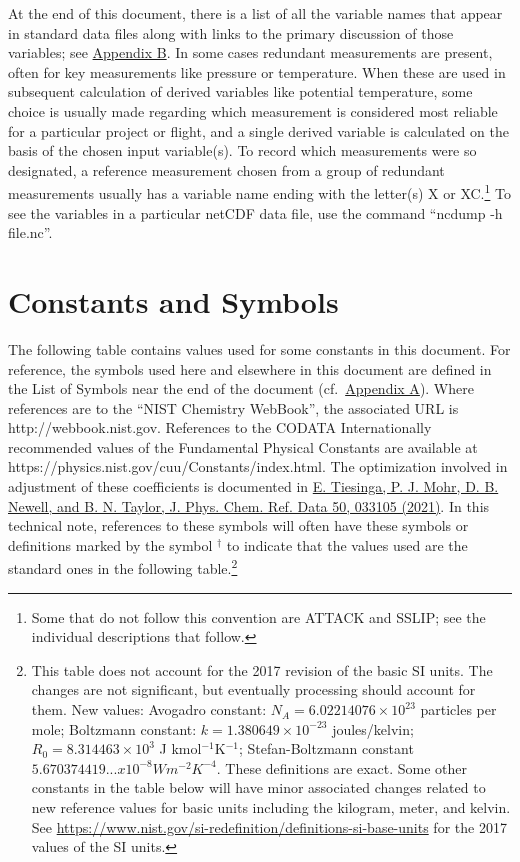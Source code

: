 \documentclass[
]{book}
\begin{document}
At the end of this document, there is a list of all the variable names that appear in standard data files along with links to the primary discussion of those variables; see \href{./appendix-b-variable-names.html\#variable-names}{Appendix B}. In some cases redundant measurements are present, often for key measurements like pressure or temperature. When these are used in subsequent calculation of derived variables like potential temperature, some choice is usually made regarding which measurement is considered most reliable for a particular project or flight, and a single derived variable is calculated on the basis of the chosen input variable(s). To record which measurements were so designated, a reference measurement chosen from a group of redundant measurements usually has a variable name ending with the letter(s) X or XC.\footnote{Some that do not follow this convention are ATTACK and SSLIP; see the individual descriptions that follow.}
To see the variables in a particular netCDF data file, use the command ``ncdump -h file.nc''.

\hypertarget{constants-and-symbols}{%
\section{Constants and Symbols}\label{constants-and-symbols}}

The following table contains values used for some constants in this document. For reference, the symbols used here and elsewhere in this document are defined in the List of Symbols near the end of the document (cf.~\href{./appendix-a-list-of-symbols.html\#list-of-symbols}{Appendix A}). Where references are to the ``NIST Chemistry WebBook'', the associated URL is http://webbook.nist.gov. References to the CODATA Internationally recommended values of the Fundamental Physical Constants are available at https://physics.nist.gov/cuu/Constants/index.html. The optimization involved in adjustment of these coefficients is documented in \href{https://aip.scitation.org/doi/10.1063/5.0064853}{E. Tiesinga, P. J. Mohr, D. B. Newell, and B. N. Taylor, J. Phys. Chem. Ref. Data 50, 033105 (2021)}.
In this technical note, references to these symbols will often have these symbols or definitions marked by the symbol \(^\dagger\) to indicate that the values used are the standard ones in the following table.\footnote{This table does not account for the 2017 revision of the basic SI units. The changes are not significant, but eventually processing should account for them. New values: Avogadro constant: \(N_A=6.02214076\times 10^{23}\) particles per mole; Boltzmann constant: \(k=1.380649 × 10^{-23}\) joules/kelvin; \(R_0=8.314463\times 10^{3}\) J kmol\(^{-1}\)K\(^{-1}\); Stefan-Boltzmann constant \(5.670374419... x 10^{-8} W m^{-2} K^{-4}\). These definitions are exact. Some other constants in the table below will have minor associated changes related to new reference values for basic units including the kilogram, meter, and kelvin. See \url{https://www.nist.gov/si-redefinition/definitions-si-base-units} for the 2017 values of the SI units.}
\end{document}
